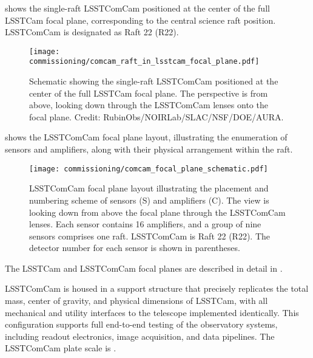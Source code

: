  shows the single-raft \gls{LSSTComCam} positioned at the center of the full LSSTCam focal plane, corresponding to the central science raft position.
\gls{LSSTComCam} is designated as Raft 22 (R22).
\begin{figure}[htb]
\centering
\texttt{[image: commissioning/comcam\_raft\_in\_lsstcam\_focal\_plane.pdf]}
\caption{Schematic showing the single-raft \gls{LSSTComCam} positioned at the center of the full LSSTCam focal plane. The perspective is from above, looking down through the \gls{LSSTComCam} lenses onto the focal plane. Credit: RubinObs/NOIRLab/SLAC/NSF/DOE/AURA.}
\label{fig:comcam_raft_in_lsstcam_focal_plane}
\vspace{0.1cm}
\end{figure}

 shows the \gls{LSSTComCam} focal plane layout, illustrating the enumeration of sensors and amplifiers, along with their physical arrangement within the raft.
\begin{figure}[htb!]
\centering
\texttt{[image: commissioning/comcam\_focal\_plane\_schematic.pdf]}
\caption{LSSTComCam focal plane layout illustrating the placement and numbering scheme of sensors (S) and amplifiers (C). The view is looking down from above the focal plane through the \gls{LSSTComCam} lenses. Each sensor contains 16 amplifiers, and a group of nine sensors comprises one raft. \gls{LSSTComCam} is Raft 22 (R22). The detector number for each sensor is shown in parentheses.}
\label{fig:comcam_focal_plane}
\vspace{0.1cm}
\end{figure}
The LSSTCam and \gls{LSSTComCam} focal planes are described in detail in \cite{ctn001}.

\gls{LSSTComCam} is housed in a support structure that precisely replicates the total mass, center of gravity, and physical dimensions of \gls{LSSTCam}, with all mechanical and utility interfaces to the telescope implemented identically.
This \gls{configuration} supports full end-to-end testing of the observatory systems, including readout electronics, image acquisition, and data pipelines.
The \gls{LSSTComCam} plate scale is \rawplatescale.


